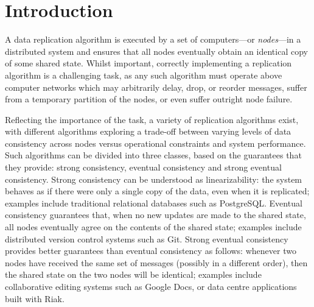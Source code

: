 \documentclass[acmlarge,review,anonymous]{acmart}\settopmatter{printfolios=true}
\begin{document}


\maketitle



\section{Introduction}
\label{sect.introduction}

A data replication algorithm is executed by a set of computers---or \emph{nodes}---in a distributed system and ensures that all nodes eventually obtain an identical copy of some shared state.
Whilst important, correctly implementing a replication algorithm is a challenging task, as any such algorithm must operate above computer networks which may arbitrarily delay, drop, or reorder messages, suffer from a temporary partition of the nodes, or even suffer outright node failure.

Reflecting the importance of the task, a variety of replication algorithms exist, with different algorithms exploring a trade-off between varying levels of data consistency across nodes versus operational constraints and system performance.
Such algorithms can be divided into three classes, based on the guarantees that they provide: strong consistency, eventual consistency and strong eventual consistency.
Strong consistency can be understood as linearizability: the system behaves as if there were only a single copy of the data, even when it is replicated; examples include traditional relational databases such as PostgreSQL.
Eventual consistency guarantees that, when no new updates are made to the shared state, all nodes eventually agree on the contents of the shared state; examples include distributed version control systems such as Git.
Strong eventual consistency provides better guarantees than eventual consistency as follows: whenever two nodes have received the same set of messages (possibly in a different order), then the shared state on the two nodes will be identical; examples include collaborative editing systems such as Google Docs, or data centre applications built with Riak.
\end{document}
